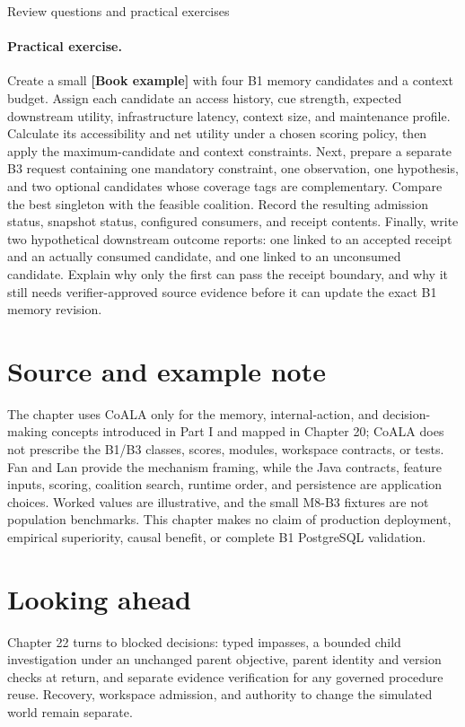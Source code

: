 \begin{reviewquestions}{Review questions and practical exercises}
\paragraph{Practical exercise.} Create a small \textbf{[Book example]} with four B1 memory candidates and a context budget. Assign each candidate an access history, cue strength, expected downstream utility, infrastructure latency, context size, and maintenance profile. Calculate its accessibility and net utility under a chosen scoring policy, then apply the maximum-candidate and context constraints. Next, prepare a separate B3 request containing one mandatory constraint, one observation, one hypothesis, and two optional candidates whose coverage tags are complementary. Compare the best singleton with the feasible coalition. Record the resulting admission status, snapshot status, configured consumers, and receipt contents. Finally, write two hypothetical downstream outcome reports: one linked to an accepted receipt and an actually consumed candidate, and one linked to an unconsumed candidate. Explain why only the first can pass the receipt boundary, and why it still needs verifier-approved source evidence before it can update the exact B1 memory revision.
\end{reviewquestions}

\section*{Source and example note}

The chapter uses CoALA only for the memory, internal-action, and decision-making concepts introduced in Part I and mapped in Chapter 20; CoALA does not prescribe the B1/B3 classes, scores, modules, workspace contracts, or tests. Fan and Lan provide the mechanism framing, while the Java contracts, feature inputs, scoring, coalition search, runtime order, and persistence are application choices. Worked values are illustrative, and the small M8-B3 fixtures are not population benchmarks. This chapter makes no claim of production deployment, empirical superiority, causal benefit, or complete B1 PostgreSQL validation.


\section*{Looking ahead}

Chapter 22 turns to blocked decisions: typed impasses, a bounded child investigation under an unchanged parent objective, parent identity and version checks at return, and separate evidence verification for any governed procedure reuse. Recovery, workspace admission, and authority to change the simulated world remain separate.
